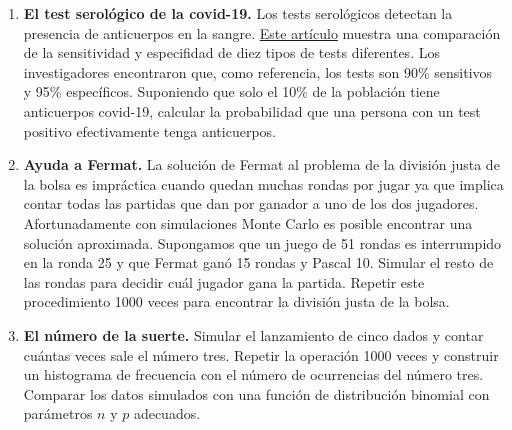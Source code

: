 \documentclass[a4paper,11pt]{article}
\begin{document}
\begin{enumerate}
\item \textbf{El test serológico de la covid-19.} Los tests serológicos detectan la presencia de anticuerpos en la sangre. \href{https://theconversation.com/coronavirus-tests-are-pretty-accurate-but-far-from-perfect-136671}{Este artículo} muestra una comparación de la sensitividad y especifidad de diez tipos de tests diferentes. Los investigadores encontraron que, como referencia, los tests son 90\% sensitivos y 95\% específicos. Suponiendo que solo el 10\% de la población tiene anticuerpos covid-19, calcular la probabilidad que una persona con un test positivo efectivamente tenga anticuerpos.

\item \textbf{Ayuda a Fermat.} La solución de Fermat al problema de la división justa de la bolsa es impráctica cuando quedan muchas rondas por jugar ya que implica contar todas las partidas que dan por ganador a uno de los dos jugadores. Afortunadamente con simulaciones Monte Carlo es posible encontrar una solución aproximada. Supongamos que un juego de 51 rondas es interrumpido en la ronda 25 y que Fermat ganó 15 rondas y Pascal 10. Simular el resto de las rondas para decidir cuál jugador gana la partida. Repetir este procedimiento 1000 veces para encontrar la división justa de la bolsa.




\item \textbf{El número de la suerte.} Simular el lanzamiento de cinco dados y contar cuántas veces sale el número tres. Repetir la operación 1000 veces y construir un histograma de frecuencia con el número de ocurrencias del número tres. Comparar los datos simulados con una función de distribución binomial con parámetros $n$ y $p$ adecuados. 


\end{enumerate}
\end{document}
